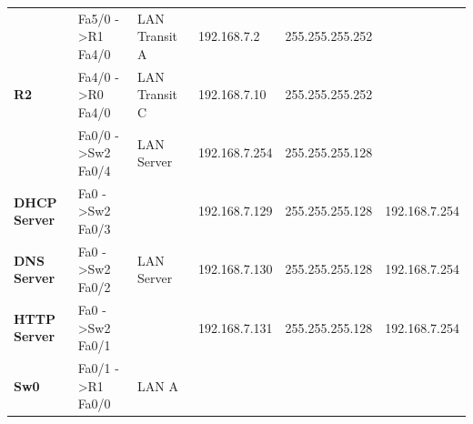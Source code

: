 \documentclass[11pt,a4paper]{report}
\begin{document}
\begin{table}[]
\begin{center}
\begin{tabular}{@{}llllll@{}}
\multirow{3}{*}{\textbf{R2}}                       & Fa5/0 -\textgreater R1 Fa4/0                             & LAN Transit A                                         & 192.168.7.2                                      & 255.255.255.252                                           &                                                       \\ \cmidrule(l){2-6}
                                                   & Fa4/0 -\textgreater R0   Fa4/0                           & LAN Transit C                                         & 192.168.7.10                                     & 255.255.255.252                                           &                                                       \\ \cmidrule(l){2-6}
                                                   & Fa0/0 -\textgreater Sw2 Fa0/4                            & LAN Server                                            & 192.168.7.254                                    & 255.255.255.128                                           &                                                       \\ \midrule
\textbf{DHCP Server}                               & Fa0 -\textgreater Sw2 Fa0/3                              & \multirow{3}{*}{LAN Server}                           & 192.168.7.129                                    & 255.255.255.128                                           & 192.168.7.254                                         \\ \cmidrule(r){1-2} \cmidrule(l){4-6}
\textbf{DNS Server}                                & Fa0 -\textgreater Sw2 Fa0/2                              &                                                       & 192.168.7.130                                    & 255.255.255.128                                           & 192.168.7.254                                         \\ \cmidrule(r){1-2} \cmidrule(l){4-6}
\textbf{HTTP Server}                               & Fa0 -\textgreater Sw2 Fa0/1                              &                                                       & 192.168.7.131                                    & 255.255.255.128                                           & 192.168.7.254                                         \\ \midrule
\multirow{3}{*}{\textbf{Sw0}}                      & Fa0/1 -\textgreater R1 Fa0/0                             & \multirow{3}{*}{LAN A}                                & \multicolumn{3}{c}{\multirow{10}{*}{}}                                                                                                                               \\ \cmidrule(lr){2-2}

\end{tabular}
\end{center}
\end{table}
\end{document}

